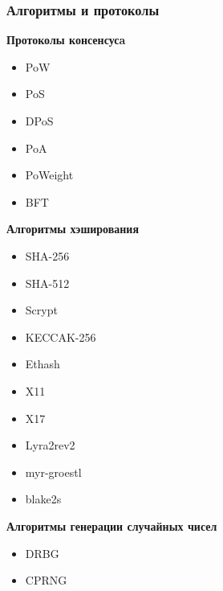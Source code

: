 \documentclass{beamer}
\begin{document}
\begin{frame}
    \frametitle{Алгоритмы и протоколы}
    \begin{multicols}{3}
        \textbf{Протоколы консенсусa}
        \vspace{0.35cm}
        \begin{itemize}
            \item PoW
            \item PoS
            \item DPoS
            \item PoA
            \item PoWeight
            \item BFT
        \end{itemize}
        \columnbreak
        \textbf{Алгоритмы хэширования}
        \vspace{0.56cm}
         \begin{itemize}
             \item SHA-256
             \item SHA-512
             \item Scrypt
             \item KECCAK-256
             \item Ethash
             \item X11
             \item X17
             \item Lyra2rev2
             \item myr-groestl
             \item blake2s
         \end{itemize}
        \columnbreak
        \textbf{Алгоритмы генерации случайных чисел}
        \begin{itemize}
            \item DRBG
            \item CPRNG
        \end{itemize}
    \end{multicols}
\end{frame}
\end{document}
